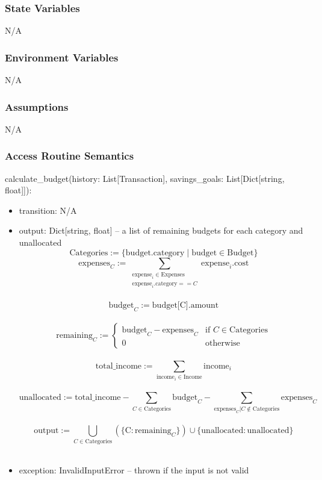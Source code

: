 \documentclass[12pt, titlepage]{article}
\begin{document}
\subsubsection{State Variables}
N/A

\subsubsection{Environment Variables}
N/A

\subsubsection{Assumptions}
N/A

\subsubsection{Access Routine Semantics}

\noindent calculate\_budget(history: List[Transaction], savings\_goals: List[Dict[string, float]]):
\begin{itemize}
\item transition: N/A
\item output: Dict[string, float] -- a list of remaining budgets for each
category and unallocated\\
\[
\text{Categories} := \{ \text{budget.category} \mid \text{budget} \in \text{Budget} \}
\]
\[
\text{expenses}_C := \sum_{\substack{\text{expense}_i \in \text{Expenses} \\ \text{expense}_i.\text{category} == C}} \text{expense}_i.\text{cost}
\]\\
\[
\text{budget}_C := \text{budget[C]}.\text{amount}
\]\\
\[
\text{remaining}_C := 
\begin{cases} 
\text{budget}_C - \text{expenses}_C & \text{if } C \in \text{Categories} \\
0 & \text{otherwise}
\end{cases}
\]\\
\[
\text{total\_income} := \sum_{\text{income}_i \in \text{Income}} \text{income}_i
\]\\
\[
\text{unallocated} := \text{total\_income} - \sum_{C \in \text{Categories}} \text{budget}_C - \sum_{ \text{expenses}_C | C \notin \text{Categories}} \text{expenses}_C
\]\\
\[
\text{output} := \bigcup_{C \in \text{Categories}} \left( \{\text{C} : \text{remaining}_C \} \right) \cup \{\text{unallocated}: \text{unallocated} \}
\]\\
\item exception: InvalidInputError -- thrown if the input is not valid
\end{itemize}
\end{document}
